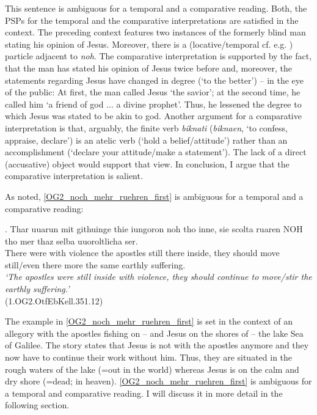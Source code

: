 \documentclass[output=paper,
modfonts
]{langscibook}
\begin{document}
This sentence is ambiguous for a temporal and a comparative reading. Both, the PSPs for the temporal and the comparative interpretations are satisfied in the context. The preceding context features two instances of the formerly blind man stating his opinion of Jesus. Moreover, there is a (locative/temporal cf. e.g. \citep{petrova2011}) particle adjacent to \textit{noh}. The comparative interpretation is supported by the fact, that the man has stated his opinion of Jesus twice before and, moreover, the statements regarding Jesus have changed in degree (`to the better') -- in the eye of the public: At first, the man called Jesus `the savior'; at the second time, he called him `a friend of god ... a divine prophet'. Thus, he lessened the degree to which Jesus was stated to be akin to god. Another argument for a comparative interpretation is that, arguably, the finite verb \textit{biknati} (\textit{biknaen}, `to confess, appraise, declare') is an atelic verb (`hold a belief/attitude') rather than an accomplishment (`declare your attitude/make a statement'). The lack of a direct (accusative) object would support that view. In conclusion, I argue that the comparative interpretation is salient.

As noted, \ref{OG2_noch_mehr_ruehren_first} is ambiguous for a temporal and a comparative reading:

\exg. Thar uuarun mit githuinge thie iungoron noh tho inne, sie scolta ruaren NOH tho mer thaz selba uuoroltlicha ser.\\
There were with violence the apostles still there inside, they should move still/even there more the same earthly suffering.\\
\textit{`The apostles were still inside with violence, they should continue to move/stir the earthly suffering.'}\label{OG2_noch_mehr_ruehren_first} \\ \flushright \vspace{-24pt} (1.OG2.OtfEbKell.351.12)

The example in \ref{OG2_noch_mehr_ruehren_first} is set in the context of an allegory with the apostles fishing on -- and Jesus on the shores of -- the lake Sea of Galilee. The story states that Jesus is not with the apostles anymore and they now have to continue their work without him. Thus, they are situated in the rough waters of the lake (=out in the world) whereas Jesus is on the calm and dry shore (=dead; in heaven). \ref{OG2_noch_mehr_ruehren_first} is ambiguous for a temporal and comparative reading. I will discuss it in more detail in the following section.
\end{document}
